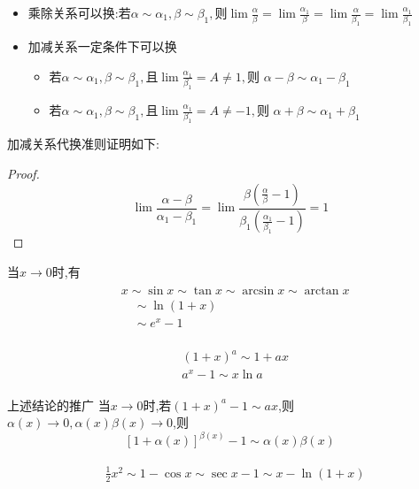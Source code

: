 \documentclass[12pt, a4paper, oneside, UTF8]{ctexbook}  %
\begin{document}
\begin{sloppypar}
    \begin{itemize}
        \item 乘除关系可以换:若$\alpha\sim\alpha_1,\beta\sim\beta_1,\text{则}\lim\frac\alpha\beta=\lim\frac{\alpha_1}\beta=\lim\frac\alpha{\beta_1}=\lim\frac{\alpha_1}{\beta_1}$
        \item 加减关系一定条件下可以换
              \begin{itemize}
                  \item 若$\alpha\sim\alpha_{1},\beta\sim\beta_{1},\text{且}\operatorname*{lim}\frac{\alpha_{1}}{\beta_{1}}=A\neq1,\text{则 }\alpha-\beta\sim\alpha_{1}-\beta_{1}$
                  \item 若$\alpha\sim\alpha_{1},\beta\sim\beta_{1},\text{且}\operatorname*{lim}\frac{\alpha_{1}}{\beta_{1}}=A\neq-1,\text{则 }\alpha+\beta\sim\alpha_{1}+\beta_{1}$
              \end{itemize}
    \end{itemize}
    加减关系代换准则证明如下:
    \begin{proof}
        $$\lim \frac{\alpha-\beta}{\alpha_1 -\beta_1}=\lim \frac{\beta (\frac{\alpha}{\beta}-1)}{\beta_1(\frac{\alpha_1}{\beta_1}-1)}=1$$
    \end{proof}
    当$x \to 0$时,有
    \begin{align*} \boxed{
            \begin{aligned}
                 & x \sim \sin x \sim \tan x \sim \arcsin x \sim \arctan x \nonumber \\
                 & \quad  \sim \ln (1+x)  \nonumber                                  \\
                 & \quad \sim e^x -1 \nonumber
            \end{aligned} }
    \end{align*}

    \begin{align*} \boxed
        {
            \begin{aligned}
                 & (1+x)^a \sim  1+ax   \\
                 & a^x - 1 \sim x \ln a
            \end{aligned}
        }
    \end{align*}
    \begin{criterion}{上述结论的推广}{}
        当$x \to 0$时,若$(1+x)^a -1 \sim ax$,则$\alpha (x) \to 0,\alpha(x)\beta(x) \to 0$,则
        $$
            [1+\alpha(x)]^{\beta(x)} -1 \sim \alpha(x) \beta(x)
        $$
    \end{criterion}
    \begin{align*} \boxed
        {
            \begin{aligned}
                 & \frac{1}{2} x^2 \sim 1-\cos x \sim \sec x -1 \sim x- \ln(1+x)
            \end{aligned}
        }
    \end{align*}


\end{sloppypar}
\end{document}
